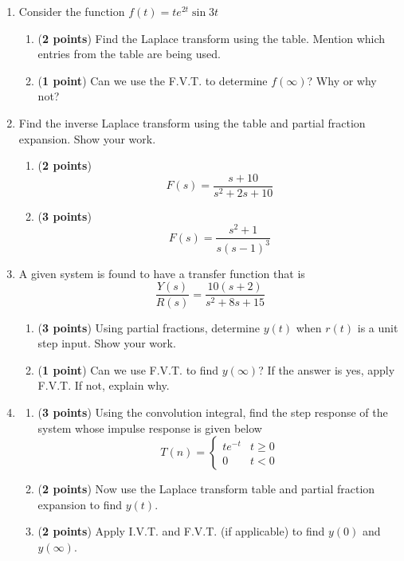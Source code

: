 \documentclass[]{article}
\begin{document}
\begin{enumerate}

    \item Consider the function $f(t)=te^{2t}\sin{3t}$
    \begin{enumerate}
        \item (\textbf{2 points}) Find the Laplace transform using the table. Mention which entries from the table are being used.
        \item (\textbf{1 point}) Can we use the F.V.T. to determine $f(\infty)$? Why or why not?
    \end{enumerate}
    \vspace{0.4 cm}


    \item Find the inverse Laplace transform using the table and partial fraction expansion. Show your work.
    \begin{enumerate}
        \item (\textbf{2 points}) $$F(s)=\frac{s+10}{s^2+2s+10}$$
        \item (\textbf{3 points}) $$F(s)=\frac{s^2+1}{s(s-1)^3}$$
    \end{enumerate}
    \vspace{0.4 cm}

    \item A given system is found to have a transfer function that is
    $$\frac{Y(s)}{R(s)}=\frac{10(s+2)}{s^2+8s+15}$$
    \begin{enumerate}
        \item (\textbf{3 points}) Using partial fractions, determine $y(t)$ when $r(t)$ is a unit step input. Show your work.
        \item (\textbf{1 point}) Can we use F.V.T. to find $y(\infty)$? If the answer is yes, apply F.V.T. If not, explain why.
    \end{enumerate}
    \vspace{0.4 cm}

    \item
    \begin{enumerate}
        \item (\textbf{3 points}) Using the convolution integral, find the step response of the system whose impulse response is given below
        \[
            T(n)=
            \begin{cases}
                te^{-t} & t \geq 0\\
                0       & t < 0
            \end{cases}
        \]
        \item (\textbf{2 points}) Now use the Laplace transform table and partial fraction expansion to find $y(t)$.
        \item (\textbf{2 points}) Apply I.V.T. and F.V.T. (if applicable) to find $y(0)$ and $y(\infty)$.
    \end{enumerate}
    \vspace{0.4 cm}


\end{enumerate}
\end{document}
